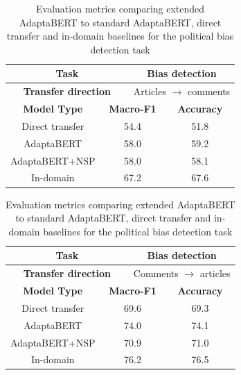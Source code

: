 \begin{table}[ht]
    \begin{center}
        \begin{tabular}{|c|c|c|c|c|c|}
            \hline
            \multicolumn{3}{|c|}{\textbf{Task}} & \multicolumn{3}{|c|}{Bias detection} \\
            \hline
            \multicolumn{3}{|c|}{\textbf{Transfer direction}} & \multicolumn{3}{|c|}{Articles $ \rightarrow $ comments} \\
            \hline \hline
            \multicolumn{2}{|c|}{\textbf{Model Type}} & \multicolumn{2}{|c|}{\textbf{Macro-F1}} & \multicolumn{2}{|c|}{\textbf{Accuracy}} \\
            \hline
            \multicolumn{2}{|c|}{Direct transfer} & \multicolumn{2}{|c|}{54.4} & \multicolumn{2}{|c|}{51.8} \\
            \multicolumn{2}{|c|}{AdaptaBERT} & \multicolumn{2}{|c|}{58.0} & \multicolumn{2}{|c|}{59.2} \\
            \multicolumn{2}{|c|}{AdaptaBERT+NSP} & \multicolumn{2}{|c|}{58.0} & \multicolumn{2}{|c|}{58.1} \\
            \hline
            \multicolumn{2}{|c|}{In-domain} & \multicolumn{2}{|c|}{67.2} & \multicolumn{2}{|c|}{67.6} \\
            \hline
        \end{tabular}
    \end{center} \vspace{10pt}
    \begin{center}
        \begin{tabular}{|c|c|c|c|c|c|}
            \hline
            \multicolumn{3}{|c|}{\textbf{Task}} & \multicolumn{3}{|c|}{Bias detection} \\
            \hline
            \multicolumn{3}{|c|}{\textbf{Transfer direction}} & \multicolumn{3}{|c|}{Comments $ \rightarrow $ articles} \\
            \hline \hline
            \multicolumn{2}{|c|}{\textbf{Model Type}} & \multicolumn{2}{|c|}{\textbf{Macro-F1}} & \multicolumn{2}{|c|}{\textbf{Accuracy}} \\
            \hline
            \multicolumn{2}{|c|}{Direct transfer} & \multicolumn{2}{|c|}{69.6} & \multicolumn{2}{|c|}{69.3}  \\
            \multicolumn{2}{|c|}{AdaptaBERT} & \multicolumn{2}{|c|}{74.0} & \multicolumn{2}{|c|}{74.1} \\
            \multicolumn{2}{|c|}{AdaptaBERT+NSP} & \multicolumn{2}{|c|}{70.9} & \multicolumn{2}{|c|}{71.0} \\
            \hline
            \multicolumn{2}{|c|}{In-domain} & \multicolumn{2}{|c|}{76.2} & \multicolumn{2}{|c|}{76.5}  \\
            \hline
        \end{tabular}
    \end{center}
    \caption{Evaluation metrics comparing extended AdaptaBERT to standard AdaptaBERT, direct transfer and in-domain baselines for the political bias detection task}
    \label{tab:adaptabert-nsp-results}
\end{table}

